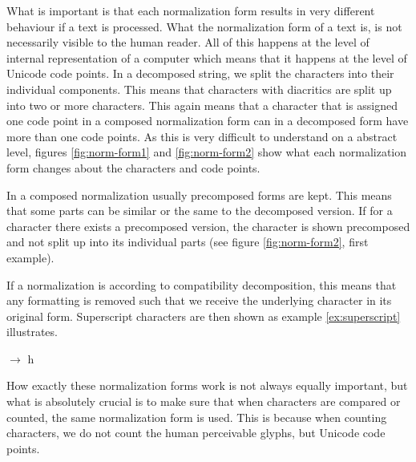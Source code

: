 What is important is that each normalization form results in very different behaviour if a text is processed. What the normalization form of a text is, is not necessarily visible to the human reader. All of this happens at the level of internal representation of a computer which means that it happens at the level of Unicode code points. In a decomposed string, we split the characters into their individual components. This means that characters with diacritics are split up into two or more characters. This again means that a character that is assigned one code point in a composed normalization form can in a decomposed form have more than one code points. As this is very difficult to understand on a abstract level, figures \ref{fig:norm-form1} and \ref{fig:norm-form2} show what each normalization form changes about the characters and code points.


In a composed normalization usually precomposed forms are kept. This means that some parts can be similar or the same to the decomposed version. If for a character there exists a precomposed version, the character is shown precomposed and not split up into its individual parts (see figure \ref{fig:norm-form2}, first example). 

If a normalization is according to compatibility decomposition, this means that any formatting is removed such that we receive the underlying character in its original form. Superscript characters are then shown as example \ref{ex:superscript} illustrates. 

\begin{covexamples}
\item \label{ex:superscript}  $\rightarrow$ h
\end{covexamples}


How exactly these normalization forms work is not always equally important, but what is absolutely crucial is to make sure that when characters are compared or counted, the same normalization form is used. This is because when counting characters, we do not count the human perceivable glyphs, but Unicode code points.  

